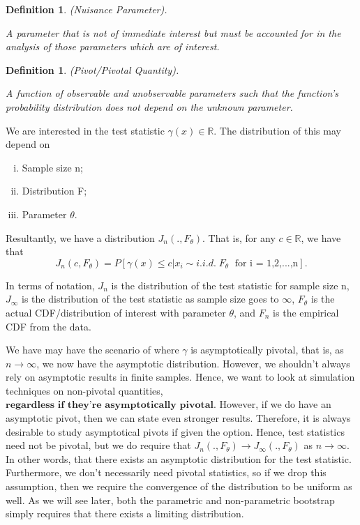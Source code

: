 \documentclass[twoside]{article}
\newtheorem{definition}[theorem]{Definition}
\begin{document}
\begin{definition}
(Nuisance Parameter).

A parameter that is not of immediate interest but must be accounted for in the analysis of those parameters which are of interest.
\end{definition}

\begin{definition}
(Pivot/Pivotal Quantity).

A function of observable and unobservable parameters such that the function's probability distribution does not depend on the unknown parameter.
\end{definition}


We are interested in the test statistic $\gamma(x) \in \mathbb{R}$. The distribution of this may depend on 
\begin{enumerate}[(i)]
  \item Sample size n;
  \item Distribution F;
  \item Parameter $\theta$.
\end{enumerate}

Resultantly, we have a distribution $J_n(.,F_{\theta})$. That is, for any $c \in \mathbb{R}$, we have that
$$
J_n(c,F_{\theta}) = P[\gamma(x) \leq c | x_i \sim i.i.d. \; F_{\theta} \; \text{ for i = 1,2,...,n}].
$$


In terms of notation, $J_n$ is the distribution of the test statistic for sample size n, $J_{\infty}$ is the distribution of the test statistic as sample size goes to $\infty$, $F_{\theta}$ is the actual CDF/distribution of interest with parameter $\theta$, and $F_n$ is the empirical CDF from the data. 

We have may have the scenario of where $\gamma$ is asymptotically pivotal, that is, as $n \rightarrow \infty$, we now have the asymptotic distribution. However, we shouldn't always rely on asymptotic results in finite samples. Hence, we want to look at simulation techniques on non-pivotal quantities, $\textbf{regardless if they're asymptotically pivotal}$. However, if we do have an asymptotic pivot, then we can state even stronger results. Therefore, it is always desirable to study asymptotical pivots if given the option. Hence, test statistics need not be pivotal, but we do require that $J_n(.,F_{\theta}) \rightarrow J_{\infty}(.,F_{\theta})$ as $n \rightarrow \infty$. In other words, that there exists an asymptotic distribution for the test statistic. Furthermore, we don't necessarily need pivotal statistics, so if we drop this assumption, then we require the convergence of the distribution to be uniform as well. As we will see later, both the parametric and non-parametric bootstrap simply requires that there exists a limiting distribution.
\end{document}
